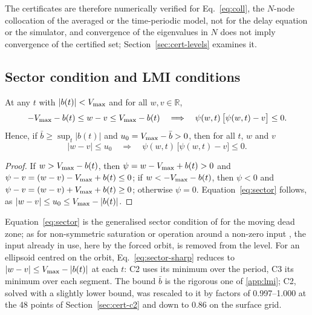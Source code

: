 The certificates are therefore numerically verified for Eq.~\eqref{eq:coll}, the $N$-node collocation of the averaged or the time-periodic model, not for the delay equation or the simulator, and convergence of the eigenvalues in $N$ does not imply convergence of the certified set; Section~\ref{sec:cert-levels} examines it.

\subsection{Sector condition and LMI conditions}\label{sec:cert-lmi}

\begin{lemma}\label{lem:sector}
At any $t$ with $\lvert b(t)\rvert<V_{\max}$ and for all $w,v\in\mathbb R$,
\begin{equation}\label{eq:sector-sharp}
-V_{\max}-b(t)\le w-v\le V_{\max}-b(t)\quad\Longrightarrow\quad\psi(w,t)\,\big[\psi(w,t)-v\big]\le0 .
\end{equation}
Hence, if $\bar b\ge\sup_t\lvert b(t)\rvert$ and $u_0=V_{\max}-\bar b>0$, then for all $t$, $w$ and $v$
\begin{equation}\label{eq:sector}
\lvert w-v\rvert\le u_0\quad\Longrightarrow\quad\psi(w,t)\,\big[\psi(w,t)-v\big]\le0 .
\end{equation}
\end{lemma}
\begin{proof}
If $w>V_{\max}-b(t)$, then $\psi=w-V_{\max}+b(t)>0$ and $\psi-v=(w-v)-V_{\max}+b(t)\le0$; if $w<-V_{\max}-b(t)$, then $\psi<0$ and $\psi-v=(w-v)+V_{\max}+b(t)\ge0$; otherwise $\psi=0$. Equation~\eqref{eq:sector} follows, as $\lvert w-v\rvert\le u_0\le V_{\max}-\lvert b(t)\rvert$.
\end{proof}

Equation~\eqref{eq:sector} is the generalised sector condition of \citet{gomesdasilva2005antiwindup} for the moving dead zone; as for non-symmetric saturation or operation around a non-zero input \citep{hu2001book,tarbouriech2011book,hu2002disturbance}, the input already in use, here by the forced orbit, is removed from the level. For an ellipsoid centred on the orbit, Eq.~\eqref{eq:sector-sharp} reduces to $\lvert w-v\rvert\le V_{\max}-\lvert b(t)\rvert$ at each $t$: C2 uses its minimum over the period, C3 its minimum over each segment. The bound $\bar b$ is the rigorous one of \ref{app:lmi}; C2, solved with a slightly lower bound, was rescaled to it by factors of 0.997--1.000 at the 48 points of Section~\ref{sec:cert-c2} and down to 0.86 on the surface grid.

